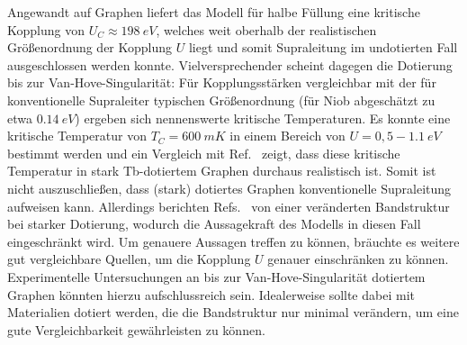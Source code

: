 Angewandt auf Graphen liefert das Modell für halbe Füllung eine kritische Kopplung von $U_C \approx \qty{198}{eV}$, welches weit oberhalb der realistischen Größenordnung der Kopplung $U$ liegt und somit Supraleitung im undotierten Fall ausgeschlossen werden konnte.
Vielversprechender scheint dagegen die Dotierung bis zur Van-Hove-Singularität:
Für Kopplungsstärken vergleichbar mit der für konventionelle Supraleiter typischen Größenordnung (für Niob abgeschätzt zu etwa $\qty{0.14}{eV}$) ergeben sich nennenswerte kritische Temperaturen.
Es konnte eine kritische Temperatur von $T_C = \qty{600}{mK}$ in einem Bereich von $U = 0,5 - \qty{1.1}{eV}$ bestimmt werden und ein Vergleich mit Ref.~\cite{herrera_topological_2024} zeigt, dass diese kritische Temperatur in stark Tb-dotiertem Graphen durchaus realistisch ist.
Somit ist nicht auszuschließen, dass (stark) dotiertes Graphen konventionelle Supraleitung aufweisen kann.
Allerdings berichten Refs.~\cite{herrera_topological_2024,mcchesney_extended_2010} von einer veränderten Bandstruktur bei starker Dotierung, wodurch die Aussagekraft des Modells in diesen Fall eingeschränkt wird.
Um genauere Aussagen treffen zu können, bräuchte es weitere gut vergleichbare Quellen, um die Kopplung $U$ genauer einschränken zu können.
Experimentelle Untersuchungen an bis zur Van-Hove-Singularität dotiertem Graphen könnten hierzu aufschlussreich sein.
Idealerweise sollte dabei mit Materialien dotiert werden, die die Bandstruktur nur minimal verändern, um eine gute Vergleichbarkeit gewährleisten zu können.

